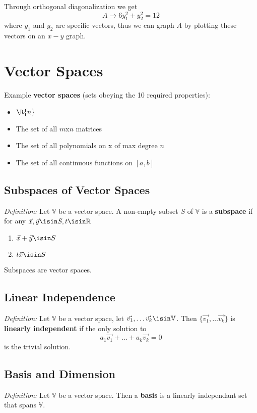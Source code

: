 \documentclass[12pt]{article}
\begin{document}
Through orthogonal diagonalization we get \[ A \to 6y_1^2 + y_2^2 = 12 \] where $y_1$ and $y_2$ are specific vectors, thus we can graph $A$ by plotting these vectors on an $x-y$ graph.

\section*{Vector Spaces}
Example {\bf vector spaces} (sets obeying the 10 required properties):
\begin{itemize}
\item $\R{n}$
\item The set of all $m$x$n$ matrices
\item The set of all polynomials on x of max degree $n$
\item The set of all continuous functions on $[a,b]$
\end{itemize}

\subsection*{Subspaces of Vector Spaces}
\textit{Definition:} Let $\mathbb{V}$ be a vector space. A non-empty subset $S$ of $\mathbb{V}$ is a {\bf subspace} if for any $\vec{x}, \vec{y} \isin S, t \isin \mathbb{R}$
\begin{enumerate}
\item $\vec{x} + \vec{y} \isin S$
\item $t\vec{x} \isin S$
\end{enumerate}

Subspaces are vector spaces.


\subsection*{Linear Independence}
\textit{Definition:} Let $\mathbb{V}$ be a vector space, let $\vec{v_1},\dots \vec{v_k} \isin \mathbb{V}$. Then $\{\vec{v_1},\dots \vec{v_k}\}$ is {\bf linearly independent} if the only solution to \[ a_1\vec{v_1} + \dots + a_k\vec{v_k} = 0 \] is the trivial solution.

\subsection*{Basis and Dimension}
\textit{Definition:} Let $\mathbb{V}$ be a vector space. Then a {\bf basis} is a linearly independant set that spans $\mathbb{V}$.
\end{document}

